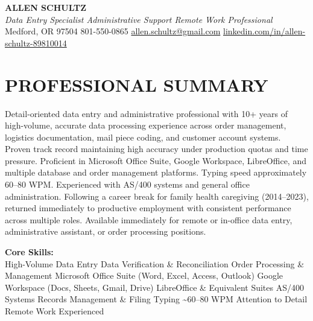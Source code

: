 \documentclass[9pt,letterpaper]{extarticle}
\begin{document}
\begin{center}
  {\LARGE\bfseries\color{accent} ALLEN SCHULTZ}\\[3pt]
  {\normalsize\itshape Data Entry Specialist \textbar{} Administrative Support \textbar{} Remote Work Professional}\\[4pt]
  {\small
    Medford, OR 97504 \textbar{} 801-550-0865 \textbar{}
    \href{mailto:allen.schultz@gmail.com}{allen.schultz@gmail.com} \textbar{}
    \href{https://linkedin.com/in/allen-schultz-89810014}{linkedin.com/in/allen-schultz-89810014}
  }
\end{center}
\vspace{-10pt}
\section*{PROFESSIONAL SUMMARY}

Detail-oriented data entry and administrative professional with 10+ years of high-volume, accurate data processing experience across order management, logistics documentation, mail piece coding, and customer account systems. Proven track record maintaining high accuracy under production quotas and time pressure. Proficient in Microsoft Office Suite, Google Workspace, LibreOffice, and multiple database and order management platforms. Typing speed approximately 60--80 WPM. Experienced with AS/400 systems and general office administration. Following a career break for family health caregiving (2014--2023), returned immediately to productive employment with consistent performance across multiple roles. Available immediately for remote or in-office data entry, administrative assistant, or order processing positions.

\smallskip
\textbf{Core Skills:}\\
High-Volume Data Entry \textbullet{}
Data Verification \& Reconciliation \textbullet{}
Order Processing \& Management \textbullet{}
Microsoft Office Suite (Word, Excel, Access, Outlook) \textbullet{}
Google Workspace (Docs, Sheets, Gmail, Drive) \textbullet{}
LibreOffice \& Equivalent Suites \textbullet{}
AS/400 Systems \textbullet{}
Records Management \& Filing \textbullet{}
Typing \textasciitilde{}60--80 WPM \textbullet{}
Attention to Detail \textbullet{}
Remote Work Experienced

\end{document}
